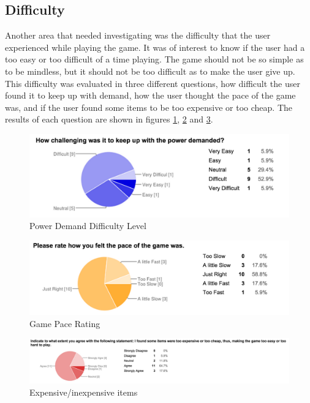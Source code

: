 \documentclass[msc,oneside]{ubcthesis}%
\begin{document}
\subsection{Difficulty}
\indent Another area that needed investigating was the difficulty that the user experienced while playing the game. It was of interest to know if the user had a too easy or too difficult of a time playing. The game should not be so simple as to be mindless, but it should not be too difficult as to make the user give up. This difficulty was evaluated in three different questions, how difficult the user found it to keep up with demand, how the user thought the pace of the game was, and if the user found some items to be too expensive or too cheap. The results of each question are shown in figures \ref{powerDemanded}, \ref{gamePase} and \ref{cost}.

\begin{figure}[hbt]
  \begin{center}
    \includegraphics[width=1\textwidth]{survey_pics/numeric/power_demanded}
    \caption[Power demanded difficulty level]{Power Demand Difficulty Level}\label{powerDemanded}
  \end{center}
\end{figure}

\begin{figure}[hbt]
  \begin{center}
    \includegraphics[width=1\textwidth]{survey_pics/numeric/game_pase}
    \caption[Game pace rating]{Game Pace Rating}\label{gamePase}
  \end{center}
\end{figure}

\bigskip
\begin{figure}[hbt]
  \begin{center}
    \includegraphics[width=1\textwidth]{survey_pics/numeric/cost}
    \caption[Price of items ]{Expensive/inexpensive items}\label{cost}
  \end{center}
\end{figure}
\end{document}

